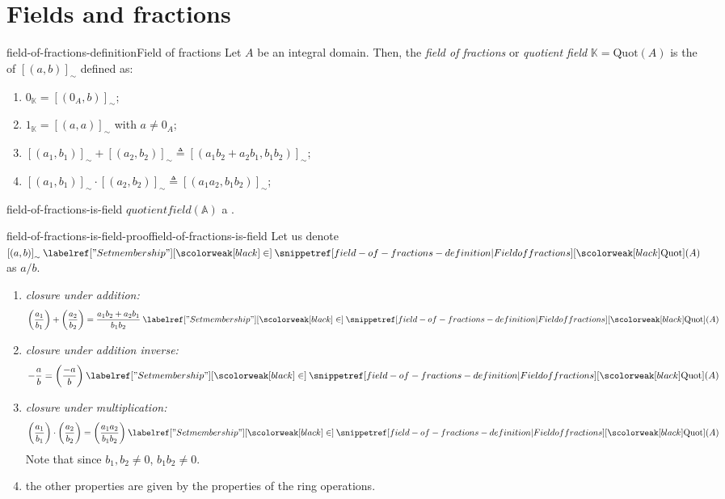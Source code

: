 \documentclass[preview]{standalone}
\begin{document}
\genpage

\section{Fields and fractions}



\begin{snippetdefinition}{field-of-fractions-definition}{Field of fractions}
    Let \(A\) be an integral domain.
    Then, the \emph{field of fractions} or \emph{quotient field}
    \(\mathbb{K} = \text{Quot}(A)\) is the \set of 
    \({[(a,b)]}_\sim\) defined as:
    \begin{enumerate}
        \item \(0_\mathbb{K} = {[(0_A,b)]}_\sim\);
        \item \(1_\mathbb{K} = {[(a,a)]}_\sim\) with \(a \neq 0_A\);
        \item \({[(a_1,b_1)]}_\sim + {[(a_2,b_2)]}_\sim \triangleq {[(a_1b_2 + a_2b_1,b_1b_2)]}_\sim\);
        \item \({[(a_1,b_1)]}_\sim \cdot {[(a_2,b_2)]}_\sim \triangleq {[(a_1a_2,b_1b_2)]}_\sim\);
    \end{enumerate}        
\end{snippetdefinition}

\begin{snippetproposition}{field-of-fractions-is-field}{}
    \(quotientfield(\mathbb{A})\) a \field.
\end{snippetproposition}

\begin{snippetproof}{field-of-fractions-is-field-proof}{field-of-fractions-is-field}{}
    Let us denote \({[(a,b)]}_\sim \in \quotientfield(A)\) as \(a/b\).
    \begin{enumerate}
        \item \emph{closure under addition:} \[
            \left(\frac{a_1}{b_1}\right)
            + \left(\frac{a_2}{b_2}\right)
            = \frac{a_1b_2 + a_2b_1}{b_1b_2} \in \quotientfield(A)
        \]
        \item \emph{closure under addition inverse:}
        \[ -\frac{a}{b} = \left(\frac{-a}{b}\right) \in \quotientfield(A) \]
        \item \emph{closure under multiplication:} \[
            \left(\frac{a_1}{b_1}\right)
            \cdot
            \left(\frac{a_2}{b_2}\right)
            = 
            \left(\frac{a_1a_2}{b_1b_2}\right)\in \quotientfield(A)
        \]
        Note that since \(b_1, b_2 \neq 0\), \(b_1b_2 \neq 0\).
        \item the other properties are given by the properties of the ring operations.
    \end{enumerate}
\end{snippetproof}
\end{document}
